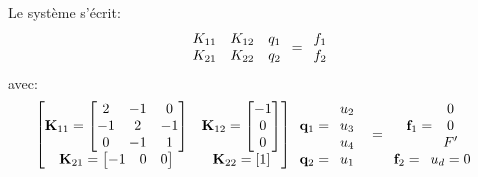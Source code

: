 Le système s'écrit:
\begin{equation}
\mathbf{\begin{array}{cc} K_{11} & K_{12}\\ K_{21} & K_{22} \end{array}}
\mathbf{\begin{array}{c} q_1\\ q_2 \end{array}} =
\mathbf{\begin{array}{c} f_1\\ f_2 \end{array}}
\end{equation}
avec:
\begin{equation*}
\begin{bmatrix}
\mathbf{K}_{11}=\begin{bmatrix} 2 & -1 & 0 \\ -1 & 2 & -1\\ 0 & -1 & 1 \end{bmatrix} &
\mathbf{K}_{12}=\begin{bmatrix}-1 \\ 0\\ 0 \end{bmatrix}\\
\mathbf{K}_{21}=\begin{bmatrix} -1 & 0 & 0 \end{bmatrix} &
\mathbf{K}_{22} =[1]
\end{bmatrix}
\mathbf{\begin{array}{c} \mathbf{q}_1=\mathbf{\begin{array}{c} u_2\\u_3\\u_4 \end{array}}\\
\mathbf{q}_2 =\mathbf{\begin{array}{c} u_1 \end{array}}\end{array}}
=
\mathbf{\begin{array}{c} \mathbf{f}_1 =\mathbf{\begin{array}{c} 0\\0\\F' \end{array}}\\ 
\mathbf{f}_2=\mathbf{\begin{array}{c} u_d=0 \end{array}}\end{array}}
\end{equation*}
